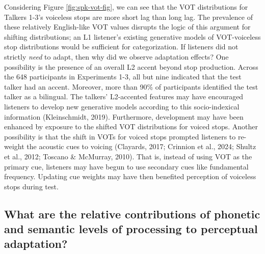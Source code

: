 \documentclass[
  12pt,
  twoside]{article}
\begin{document}
Considering Figure \ref{fig:spk-vot-fig}, we can see that the VOT distributions for Talkers 1-3's voiceless stops are more short lag than long lag.
The prevalence of these relatively English-like VOT values disrupts the logic of this argument for shifting distributions; an L1 listener's existing generative models of VOT-voiceless stop distributions would be sufficient for categorization.
If listeners did not strictly \emph{need} to adapt, then why did we observe adaptation effects?
One possibility is the presence of an overall L2 accent beyond stop production.
Across the 648 participants in Experiments 1-3, all but nine indicated that the test talker had an accent.
Moreover, more than 90\% of participants identified the test talker as a bilingual.
The talkers' L2-accented features may have encouraged listeners to develop new generative models according to this socio-indexical information (Kleinschmidt, 2019).
Furthermore, development may have been enhanced by exposure to the shifted VOT distributions for voiced stops.
Another possibility is that the shift in VOTs for voiced stops prompted listeners to re-weight the acoustic cues to voicing (Clayards, 2017; Crinnion et al., 2024; Shultz et al., 2012; Toscano \& McMurray, 2010).
That is, instead of using VOT as the primary cue, listeners may have begun to use secondary cues like fundamental frequency.
Updating cue weights may have then benefited perception of voiceless stops during test.

\hypertarget{what-are-the-relative-contributions-of-phonetic-and-semantic-levels-of-processing-to-perceptual-adaptation}{%
\subsection{What are the relative contributions of phonetic and semantic levels of processing to perceptual adaptation?}\label{what-are-the-relative-contributions-of-phonetic-and-semantic-levels-of-processing-to-perceptual-adaptation}}
\end{document}
